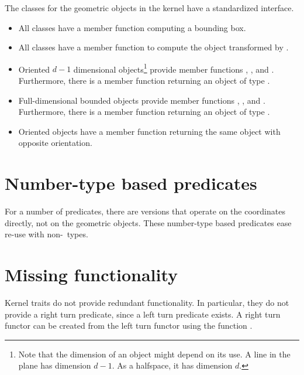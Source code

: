 The classes for the geometric objects in the kernel have a 
standardized interface.%
\begin{itemize}
\item
All classes have a  member function computing a bounding box.
\item
All classes have a  member function
to compute the object transformed by .%
\item
Oriented $d-1$ dimensional objects\footnote{Note that the dimension
of an object might depend on its use. A line in the plane has dimension
$d-1$. As a halfspace, it has dimension $d$.} provide member functions
%
, %
, 
and %
. Furthermore, there is a member
function %
 returning an object of type
.
\item
Full-dimensional bounded objects provide member functions
%
, %
, 
and %
. Furthermore, there is a member
function %
 returning an object of type
.
\item
Oriented objects have a member function %
 returning
the same object with opposite orientation.
\end{itemize}


\section{Number-type based predicates}
For a number of predicates, there are versions that operate on
the coordinates directly, not on the geometric objects. These
number-type based predicates ease re-use with non-\cgal\ types.

\section{Missing functionality}
\label{sec:NewKernelTraits}
 Kernel traits do not provide
redundant functionality. In particular, they do not provide a right
turn predicate, since a left turn predicate exists. A right turn
functor can be created from the left turn functor using the function
.

